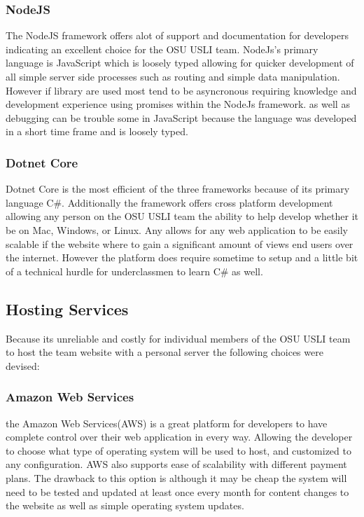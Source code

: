 \documentclass[onecolumn, draftclsnofoot,10pt, compsoc]{IEEEtran}
\begin{document}
\subsubsection{NodeJS}
The NodeJS framework offers alot of support and documentation for developers indicating an excellent choice for the OSU USLI team. NodeJs's primary language is JavaScript which is loosely typed allowing for quicker development of all simple server side processes such as routing and simple data manipulation. However if library are used most tend to be asyncronous requiring knowledge and development experience using promises within the NodeJs framework. as well as debugging can be trouble some in JavaScript because the language was developed in a short time frame and is loosely typed.
\subsubsection{Dotnet Core}
Dotnet Core is the most efficient of the three frameworks because of its primary language C\#. Additionally the framework offers cross platform development allowing any person on the OSU USLI team the ability to help develop whether it be on Mac, Windows, or Linux. Any allows for any web application to be easily scalable if the website where to gain a significant amount of views end users over the internet. However the platform does require sometime to setup and a little bit of a technical hurdle for underclassmen to learn C\# as well. 


\subsection{Hosting Services}
Because its unreliable and costly for individual members of the OSU USLI team to host the team website with a personal server the following choices were devised:
\subsubsection{Amazon Web Services}
the Amazon Web Services(AWS) is a great platform for developers to have complete control over their web application in every way. Allowing the developer to choose what type of operating system will be used to host, and customized to any configuration. AWS also supports ease of scalability with different payment plans. The drawback to this option is although it may be cheap the system will need to be tested and updated at least once every month for content changes to the website as well as simple operating system updates.
\end{document}
